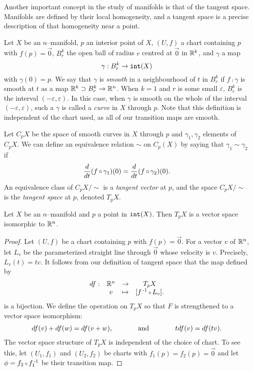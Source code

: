 Another important concept in the study of manifolds is that of the tangent space.
Manifolds are defined by their local homogeneity, and a tangent space is a precise description of that homogeneity near a point.

\begin{defn}
	\label{def:tangentspace}
	Let $X$ be an $n$--manifold, $p$ an interior point of $X$, $(U,f)$ a chart containing $p$ with $f(p)=\vec{0}$, $B_r^k$ the open ball of radius $r$ centred at $\vec{0}$ in $\mathbb{R}^k$, and $\gamma$ a map $$\gamma:B_r^k\to \mathtt{int}(X)$$
	with $\gamma(0)=p$.
	We say that $\gamma$ is \emph{smooth} in a neighbourhood of $t$ in $B_r^k$ if $f\comp\gamma$ is smooth at $t$ as a map $\mathbb{R}^k\supset B_r^k\to\mathbb{R}^n$.
	When $k=1$ and $r$ is some small $\varepsilon$, $B_r^k$ is the interval $(-\varepsilon, \varepsilon)$.
	In this case, when $\gamma$ is smooth on the whole of the interval $(-\varepsilon, \varepsilon)$, such a $\gamma$ is called a \emph{curve} in $X$ through $p$.
	Note that this definition is independent of the chart used, as all of our transition maps are smooth.
	
	Let $C_p X$ be the space of smooth curves in $X$ through $p$ and $\gamma_1, \gamma_2$ elements of $C_p X$.
	We can define an equivalence relation $\sim$ on $C_p(X)$ by saying that $\gamma_1\sim\gamma_2$ if
	\[
		\Ddt(f\comp\gamma_1)(0) = \Ddt(f\comp\gamma_2)(0).
	\]
	An equivalence class of $C_p X/\sim$ is a \emph{tangent vector} at $p$, and the space $C_p X/\sim$ is the \emph{tangent space} at $p$, denoted $T_p X$.
\end{defn}

\begin{prop}
	\label{prop:tangentspacevectorspace}
	Let $X$ be an $n$--manifold and $p$ a point in $\mathtt{int}(X)$.
	Then $T_p X$ is a vector space isomorphic to $\mathbb{R}^n$.
\end{prop}

\begin{proof}
	Let $(U,f)$ be a chart containing $p$ with $f(p)=\vec{0}$.
	For a vector $v$ of $\mathbb{R}^n$, let $L_v$ be the parameterized straight line through $\vec{0}$ whose velocity is $v$.
	Precisely, $L_v(t)=tv.$
	It follows from our definition of tangent space that the map defined by
	\[
		\begin{array}{cccc}
			df : & \RRN & \to & T_p X \\
			& v & \mapsto & [f\inv\comp L_v] .
		\end{array}
	\]
	is a bijection.
	We define the operation on $T_p X$ so that $F$ is strengthened to a vector space isomorphism:
	\[
		\begin{array}{ccc}
			df(v)+df(w)=df(v+w), & \hspace{10mm} \text{and} \hspace{10mm} & tdf(v)=df(tv).
		\end{array}
	\]
	The vector space structure of $T_p X$ is independent of the choice of chart.
	To see this, let $(U_1, f_1)$ and $(U_2, f_2)$ be charts with $f_1(p)=f_2(p)=\vec{0}$ and let $\phi=f_2\comp f_1\inv$ be their transition map.
	
\end{proof}

